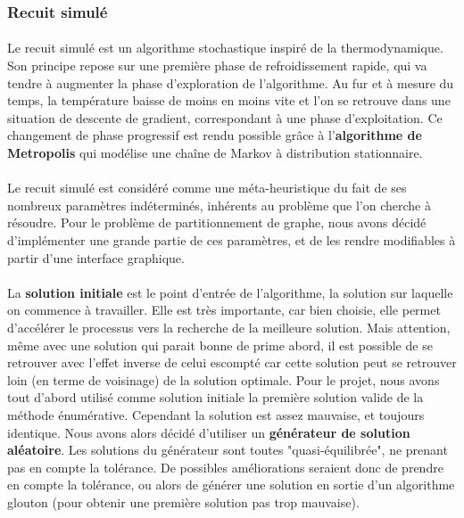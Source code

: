 \documentclass[12pt]{article}
\begin{document}
\subsubsection{Recuit simulé}

\paragraph{}Le recuit simulé est un algorithme stochastique inspiré de la thermodynamique. Son principe repose sur une première phase de refroidissement rapide, qui va tendre à augmenter la phase d'exploration de l'algorithme. Au fur et à mesure du temps, la température baisse de moins en moins vite et l'on se retrouve dans une situation de descente de gradient, correspondant à une phase d'exploitation. Ce changement de phase progressif est rendu possible grâce à l'\textbf{algorithme de Metropolis} qui modélise une chaîne de Markov à distribution stationnaire.

\paragraph{}Le recuit simulé est considéré comme une méta-heuristique du fait de ses nombreux paramètres indéterminés, inhérents au problème que l'on cherche à résoudre. Pour le problème de partitionnement de graphe, nous avons décidé d'implémenter une grande partie de ces paramètres, et de les rendre modifiables à partir d'une interface graphique.

\paragraph{}La \textbf{solution initiale} est le point d'entrée de l'algorithme, la solution sur laquelle on commence à travailler. Elle est très importante, car bien choisie, elle permet d'accélérer le processus vers la recherche de la meilleure solution. Mais attention, même avec une solution qui parait bonne de prime abord, il est possible de se retrouver avec l'effet inverse de celui escompté car cette solution peut se retrouver loin (en terme de voisinage) de la solution optimale. Pour le projet, nous avons tout d'abord utilisé comme solution initiale la première solution valide de la méthode énumérative. Cependant la solution est assez mauvaise, et toujours identique. Nous avons alors décidé d'utiliser un \textbf{générateur de solution aléatoire}. Les solutions du générateur sont toutes "quasi-équilibrée", ne prenant pas en compte la tolérance. De possibles améliorations seraient donc de prendre en compte la tolérance, ou alors de générer une solution en sortie d'un algorithme glouton (pour obtenir une première solution pas trop mauvaise).
\end{document}
